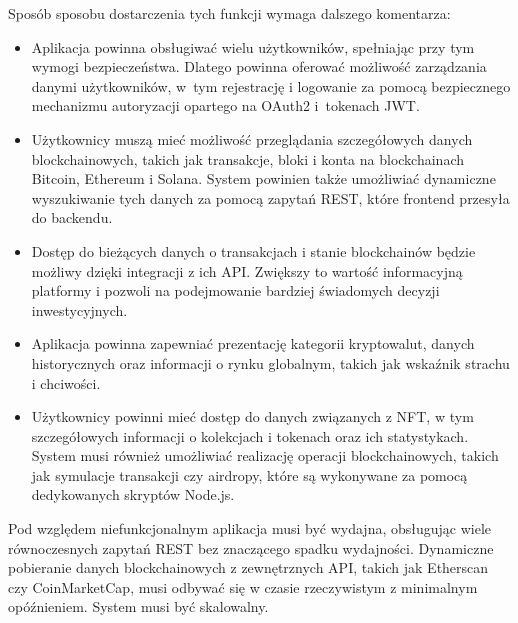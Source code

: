 Sposób sposobu dostarczenia tych funkcji wymaga dalszego komentarza:
\begin{itemize}
\item Aplikacja powinna obsługiwać wielu użytkowników, spełniając przy tym wymogi bezpieczeństwa. Dlatego powinna oferować możliwość zarządzania danymi użytkowników, w~tym rejestrację i logowanie za pomocą bezpiecznego mechanizmu autoryzacji opartego na OAuth2 i~tokenach JWT. 
\item Użytkownicy muszą mieć możliwość przeglądania szczegółowych danych blockchainowych, takich jak transakcje, bloki i konta na blockchainach Bitcoin, Ethereum i Solana. System powinien także umożliwiać dynamiczne wyszukiwanie tych danych za pomocą zapytań REST, które frontend przesyła do backendu.
\item Dostęp do bieżących danych o transakcjach i stanie blockchainów będzie możliwy dzięki integracji z ich API. Zwiększy to wartość informacyjną platformy i pozwoli na podejmowanie bardziej świadomych decyzji inwestycyjnych.
\item Aplikacja powinna zapewniać prezentację kategorii kryptowalut, danych historycznych oraz informacji o rynku globalnym, takich jak wskaźnik strachu i chciwości. 
\item Użytkownicy powinni mieć dostęp do danych związanych z NFT, w tym szczegółowych informacji o kolekcjach i tokenach oraz ich statystykach. System musi również umożliwiać realizację operacji blockchainowych, takich jak symulacje transakcji czy airdropy, które są wykonywane za pomocą dedykowanych skryptów Node.js.
\end{itemize}

Pod względem niefunkcjonalnym aplikacja musi być wydajna, obsługując wiele równoczesnych zapytań REST bez znaczącego spadku wydajności. Dynamiczne pobieranie danych blockchainowych z zewnętrznych API, takich jak Etherscan czy CoinMarketCap, musi odbywać się w czasie rzeczywistym z minimalnym opóźnieniem. System musi być skalowalny.

